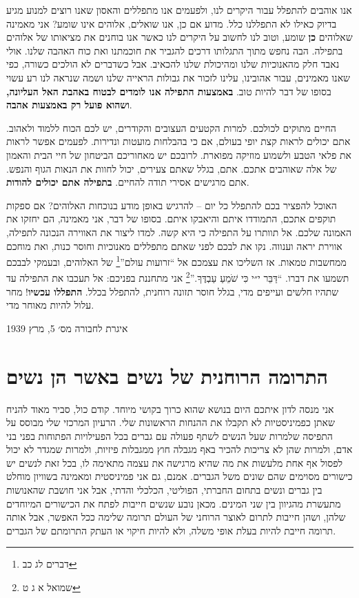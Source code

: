 \documentclass[14pt, article, extrafontsizes, twopage, a4paper]{memoir}
\newcommand{\attr}[1]{
{\raggedright\smaller#1}
}
\begin{document}
אנו אוהבים להתפלל עבור היקרים לנו, ולפעמים אנו מתפללים והאסון שאנו רוצים למנוע מגיע בדיוק כאילו לא התפללנו כלל. מדוע אם כן, אנו שואלים, אלוהים אינו שומע? אני מאמינה שאלוהים \textbf {כן} שומע, וטוב לנו לחשוב על היקרים לנו כאשר אנו בוחנים את מציאותו של אלוהים בתפילה. הבה נחפש מתוך התגלותו דרכים להגביר את חוכמתנו ואת כוח האהבה שלנו. אולי נאבד חלק מהאנוכיות שלנו ומהיכולת שלנו להכאיב. אבל כשדברים לא הולכים כשורה, כפי שאנו מאמינים, עבור אהובינו, עלינו לזכור את גבולות הראייה שלנו ושמה שנראה לנו רע עשוי בסופו של דבר להיות טוב. \textbf{באמצעות התפילה אנו לומדים לבטוח באהבת האל העליונה, ושהוא פועל רק באמצעות אהבה}.

החיים מתוקים לכולכם. למרות הקטעים העצובים והקודרים, יש לכם הכוח ללמוד ולאהוב. אתם יכולים לראות קצת יופי בעולם, אם כי בהבלחות מועטות ונדירות. לפעמים אפשר לראות את פלאי הטבע ולשמוע מוזיקה מפוארת. לרובכם יש מאחוריכם הביטחון של חיי הבית והאמון של אלה שאוהבים אתכם. אתם, בגלל שאתם צעירים, יכול לחוות את הנאות הגוף והנפש. אתם מרגישים אסירי תודה להחיים. \textbf{בתפילה אתם יכולים להודות}.

האוכל להפציר בכם להתפלל כל יום -- להרגיש באופן מודע בנוכחות האלוהים? אם ספקות תוקפים אתכם, התמודדו איתם והיאבקו איתם. בסופו של דבר, אני מאמינה, הם יחזקו את האמונה שלכם. אל תוותרו על התפילה כי היא קשה. למדו ליצור את האווירה הנכונה לתפילה, אווירת יראה וענווה. נקו את לבכם לפני שאתם מתפללים מאנוכיות וחוסר כנות, ואת מוחכם ממחשבות טמאות. אז השליכו את עצמכם אל ``זרועות עולם''\footnote{דברים לג כב} של האלוהים, ובעמקי לבבכם תשמעו את דברו. ``דַּבֵּר י״י כִּי שֹׁמֵעַ עַבְדֶּךָ.''\footnote{שמואל א ג ט} אני מתחננת בפניכם: אל תעכבו את התפילה עד שתהיו חלשים ועייפים מדי, בגלל חוסר תזונה רוחנית, להתפלל בכלל. \textbf{התפללו עכשיו}! מחר עלול להיות מאוחר מדי.

\attr{איגרת לחבורה מס׳ 5, מרץ 1939}

\chapter{התרומה הרוחנית של נשים באשר הן נשים}

אני מנסה לדון איתכם היום בנושא
שהוא כרוך בקושי מיוחד. קודם כול,
סביר מאוד להניח שאתן כפמיניסטיות לא תקבלו
את ההנחות הראשונות שלי. הרעיון המרכזי שלי מבוסס על התפיסה
שלמרות שעל הנשים לשתף פעולה עם גברים בכל
הפעילויות הפתוחות בפני בני אדם, ולמרות שהן לא צריכות
להכיר באף מגבלה חוץ ממגבלות פיזיות, ולמרות שמגדר
לא יכול לפסול אף אחת מלעשות את מה שהיא
מרגישה את עצמה מתאימה לו, בכל זאת לנשים יש כישורים מסוימים
שהם שונים משל הגברים. אמנם,
גם אני פמיניסטית ומאמינה בשוויון מוחלט בין
גברים ונשים בתחום החברתי, הפוליטי, הכלכלי והדתי,
אבל אני חושבת שהאנושות מתעשרת
מהגיוון בין שני המינים. מכאן נובע שנשים חייבות
לפתח את הכישורים המיוחדים שלהן, ושהן חייבות לתרום
לאוצר הרוחני של העולם תרומה שלימה
ככל האפשר, אבל אותה תרומה חייבת להיות בעלת אופי משלה,
ולא להיות חיקוי או העתק התרומתם
של הגברים.
\end{document}
